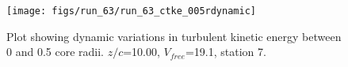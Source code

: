 \begin{figure}[H]
\centering
\texttt{[image: figs/run\_63/run\_63\_ctke\_005rdynamic]}
\caption{Plot showing dynamic variations in turbulent kinetic energy between 0 and 0.5 core radii. $z/c$=10.00, $V_{free}$=19.1, station 7.}
\end{figure}


